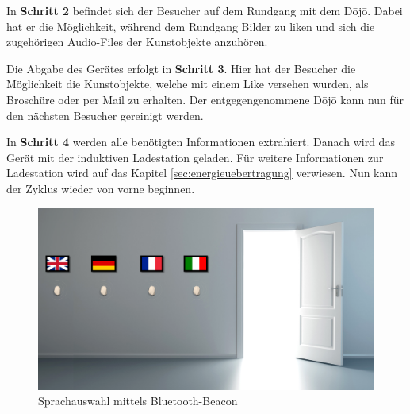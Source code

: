 In \textbf{Schritt 2} befindet sich der Besucher auf dem Rundgang mit dem Dōjō. Dabei hat er die Möglichkeit, während dem Rundgang Bilder zu {\glqq liken\grqq} und sich die zugehörigen Audio-Files der Kunstobjekte anzuhören.

Die Abgabe des Gerätes erfolgt in \textbf{Schritt 3}. Hier hat der Besucher die Möglichkeit die Kunstobjekte, welche mit einem {\glqq Like\grqq} versehen wurden, als Broschüre oder per Mail zu erhalten. Der entgegengenommene Dōjō kann nun für den nächsten Besucher gereinigt werden.

In \textbf{Schritt 4} werden alle benötigten Informationen extrahiert. Danach wird das Gerät mit der induktiven Ladestation geladen. Für weitere Informationen zur Ladestation wird auf das Kapitel \ref{sec:energieuebertragung} verwiesen. Nun kann der Zyklus wieder von vorne beginnen.
\begin{figure}[H]
	\begin{center}
		\includegraphics[width=140mm]{data/BeaconSpracherkennung.png}
		\caption[Sprachauswahl mittels Bluetooth-Beacon]{Sprachauswahl mittels Bluetooth-Beacon} %
		\label{fig:SprachauswahlBeacon}
	\end{center}
\end{figure}
